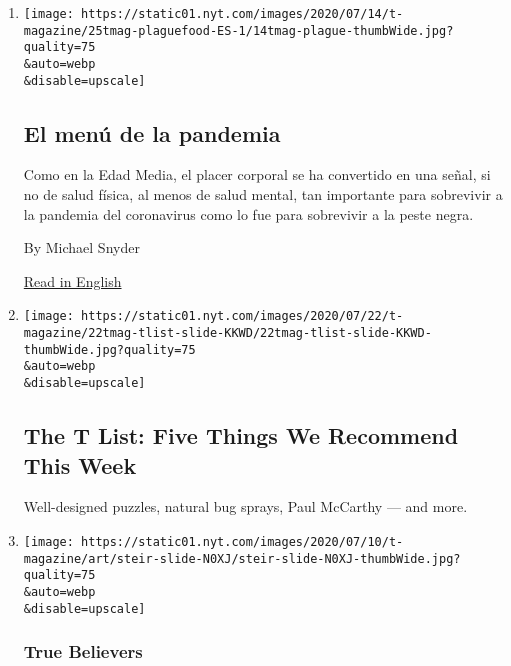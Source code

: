 \begin{enumerate}
\def\labelenumi{\arabic{enumi}.}
\item
  \href{/es/2020/07/23/t-magazine/comida-pandemia.html}{}

  \texttt{[image: https://static01.nyt.com/images/2020/07/14/t-magazine/25tmag-plaguefood-ES-1/14tmag-plague-thumbWide.jpg?quality=75\\\&auto=webp\\\&disable=upscale]}

  \hypertarget{el-menuxfa-de-la-pandemia}{%
  \subsection{El menú de la pandemia}\label{el-menuxfa-de-la-pandemia}}

  Como en la Edad Media, el placer corporal se ha convertido en una
  señal, si no de salud física, al menos de salud mental, tan importante
  para sobrevivir a la pandemia del coronavirus como lo fue para
  sobrevivir a la peste negra.

  By Michael Snyder

  \href{https://www.nytimes.com/2020/07/16/t-magazine/eating-food-during-plague.html}{Read
  in English}
\item
  \href{/2020/07/23/t-magazine/puzzles-bug-spray-tlist.html}{}

  \texttt{[image: https://static01.nyt.com/images/2020/07/22/t-magazine/22tmag-tlist-slide-KKWD/22tmag-tlist-slide-KKWD-thumbWide.jpg?quality=75\\\&auto=webp\\\&disable=upscale]}

  \hypertarget{the-t-list-five-things-we-recommend-this-week-1}{%
  \subsection{The T List: Five Things We Recommend This
  Week}\label{the-t-list-five-things-we-recommend-this-week-1}}

  Well-designed puzzles, natural bug sprays, Paul McCarthy --- and more.
\item
  \href{/2020/07/21/t-magazine/pat-steir.html}{}

  \texttt{[image: https://static01.nyt.com/images/2020/07/10/t-magazine/art/steir-slide-N0XJ/steir-slide-N0XJ-thumbWide.jpg?quality=75\\\&auto=webp\\\&disable=upscale]}

  \hypertarget{true-believers-8}{%
  \subsubsection{True Believers}\label{true-believers-8}}


\end{enumerate}
